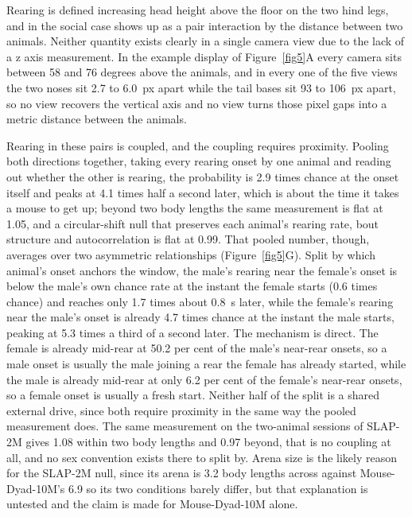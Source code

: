 \documentclass[pdflatex, sn-nature]{sn-jnl}
\theoremstyle{thmstyleone}%
\theoremstyle{thmstyletwo}%
\theoremstyle{thmstylethree}%
\begin{document}
Rearing is defined increasing head height above the floor on the two hind legs, and in the social case shows up as a pair interaction by the distance between two animals. Neither quantity exists clearly in a single camera view due to the lack of a z axis measurement. In the example display of Figure~\ref{fig5}A every camera sits between 58 and 76 degrees above the animals, and in every one of the five views the two noses sit 2.7 to 6.0~px apart while the tail bases sit 93 to 106~px apart, so no view recovers the vertical axis and no view turns those pixel gaps into a metric distance between the animals.

Rearing in these pairs is coupled, and the coupling requires proximity. Pooling both directions together, taking every rearing onset by one animal and reading out whether the other is rearing, the probability is 2.9 times chance at the onset itself and peaks at 4.1 times half a second later, which is about the time it takes a mouse to get up; beyond two body lengths the same measurement is flat at 1.05, and a circular-shift null that preserves each animal's rearing rate, bout structure and autocorrelation is flat at 0.99. That pooled number, though, averages over two asymmetric relationships (Figure~\ref{fig5}G). Split by which animal's onset anchors the window, the male's rearing near the female's onset is below the male's own chance rate at the instant the female starts (0.6 times chance) and reaches only 1.7 times about 0.8~s later, while the female's rearing near the male's onset is already 4.7 times chance at the instant the male starts, peaking at 5.3 times a third of a second later. The mechanism is direct. The female is already mid-rear at 50.2 per cent of the male's near-rear onsets, so a male onset is usually the male joining a rear the female has already started, while the male is already mid-rear at only 6.2 per cent of the female's near-rear onsets, so a female onset is usually a fresh start. Neither half of the split is a shared external drive, since both require proximity in the same way the pooled measurement does. The same measurement on the two-animal sessions of SLAP-2M gives 1.08 within two body lengths and 0.97 beyond, that is no coupling at all, and no sex convention exists there to split by. Arena size is the likely reason for the SLAP-2M null, since its arena is 3.2 body lengths across against Mouse-Dyad-10M's 6.9 so its two conditions barely differ, but that explanation is untested and the claim is made for Mouse-Dyad-10M alone.
\end{document}

